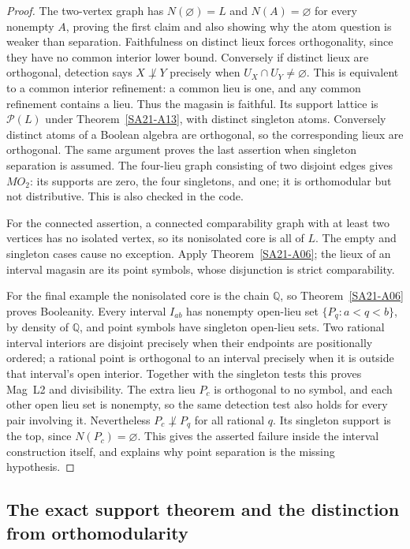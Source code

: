 \begin{proof}
The two-vertex graph has $N(\varnothing)=L$ and $N(A)=\varnothing$
for every nonempty $A$, proving the first claim and also showing why
the atom question is weaker than separation.
Faithfulness on distinct lieux forces orthogonality, since they have
no common interior lower bound. Conversely if distinct lieux are
orthogonal, detection says $X\not\perp Y$ precisely when
$U_X\cap U_Y\ne\varnothing$. This is equivalent to a common
interior refinement: a common lieu is one, and any common refinement
contains a lieu. Thus the magasin is faithful. Its support lattice
is $\mathscr P(L)$ under Theorem~\ref{SA21-A13}, with distinct
singleton atoms. Conversely distinct atoms of a Boolean algebra are
orthogonal, so the corresponding lieux are orthogonal. The same
argument proves the last assertion when singleton separation is
assumed. The four-lieu graph consisting of two disjoint edges gives
$MO_2$: its supports are zero, the four singletons, and one; it is
orthomodular but not distributive. This is also checked in the code.

For the connected assertion, a connected comparability graph with
at least two vertices has no isolated vertex, so its nonisolated
core is all of $L$. The empty and singleton cases cause no exception.
Apply Theorem~\ref{SA21-A06}; the lieux of an interval magasin are
its point symbols, whose disjunction is strict comparability.

For the final example the nonisolated core is the chain $\mathbb Q$,
so Theorem~\ref{SA21-A06} proves Booleanity. Every interval $I_{ab}$
has nonempty open-lieu set $\{P_q:a<q<b\}$, by density of
$\mathbb Q$, and point symbols have singleton open-lieu sets.
Two rational interval interiors are disjoint precisely when their
endpoints are positionally ordered; a rational point is orthogonal to an
interval precisely when it is outside that interval's open interior.
Together with the singleton tests this proves Mag~L2 and divisibility.
The extra lieu $P_c$ is orthogonal to no symbol, and each other open
lieu set is nonempty, so the same detection test also holds for every
pair involving it. Nevertheless $P_c\not\perp P_q$ for all rational
$q$. Its singleton support is the top, since $N(P_c)=\varnothing$.
This gives the asserted failure inside the interval construction
itself, and explains why point separation is the missing hypothesis.
\end{proof}

\subsection{The exact support theorem and the distinction from orthomodularity}

